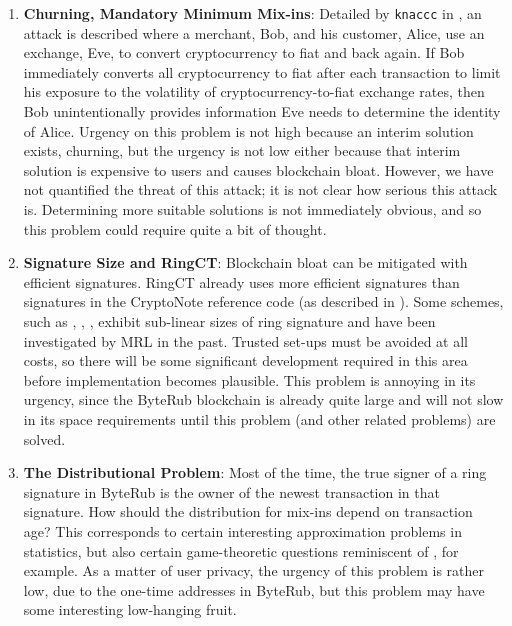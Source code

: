 \documentclass[12pt,english]{mrl}
\theoremstyle{definition}
\numberwithin{equation}{section}
\numberwithin{figure}{section}
\numberwithin{equation}{section}
\numberwithin{equation}{section}
\numberwithin{figure}{section}
\begin{document}
\begin{enumerate}[1.]
    
    \item \textbf{Churning, Mandatory Minimum Mix-ins}: Detailed by \texttt{knaccc} in \cite{knaccc2017}, an attack is described where a merchant, Bob, and his customer, Alice, use an exchange, Eve, to convert cryptocurrency to fiat and back again. If Bob immediately converts all cryptocurrency to fiat after each transaction to limit his exposure to the volatility of cryptocurrency-to-fiat exchange rates, then Bob unintentionally provides information Eve needs to determine the identity of Alice. Urgency on this problem is not high because an interim solution exists, churning, but the urgency is not low either because that interim solution is expensive to users and causes blockchain bloat. However, we have not quantified the threat of this attack; it is not clear how serious this attack is. Determining more suitable solutions is not immediately obvious, and so this problem could require quite a bit of thought.
    
    \item \textbf{Signature Size and RingCT}:  Blockchain bloat can be mitigated with efficient signatures. RingCT already uses more efficient signatures than signatures in the CryptoNote reference code (as described in \cite{noether2016ring}). Some schemes, such as \cite{chandran2007ring},  \cite{au2006constant}, \cite{au2006event}, exhibit sub-linear sizes of ring signature and have been investigated by MRL in the past. Trusted set-ups must be avoided at all costs, so there will be some significant development required in this area before implementation becomes plausible. This problem is annoying in its urgency, since the ByteRub blockchain is already quite large and will not slow in its space requirements until this problem (and other related problems) are solved.
    
    
    \item \textbf{The Distributional Problem}: Most of the time, the true signer of a ring signature in ByteRub is the owner of the newest transaction in that signature. How should the distribution for mix-ins depend on transaction age? This corresponds to certain interesting approximation problems in statistics, but also certain game-theoretic questions reminiscent of \cite{T-1955}, for example. As a matter of user privacy, the urgency of this problem is rather low, due to the one-time addresses in ByteRub, but this problem may have some interesting low-hanging fruit.
    

    
    

\end{enumerate}
\end{document}
